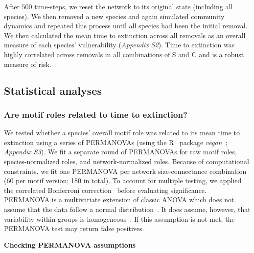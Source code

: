 \documentclass[12pt]{article}
\begin{document}
\begin{spacing}{2.0}
            After 500 time-steps, we reset the network to its original state (including all species). 
            We then removed a new species and again simulated community dynamics and repeated this process until all species had been the initial removal.
    		We then calculated the mean time to extinction across all removals as an overall measure of each species' vulnerability (\emph{Appendix S2}). 
    		Time to extinction was highly correlated across removals in all combinations of S and C and is a robust measure of risk.


	\subsection*{Statistical analyses}

		\subsubsection*{Are motif roles related to time to extinction?}

            We tested whether a species' overall motif role was related to its mean time to extinction using a series of PERMANOVAs (using the R~\citep{R} package \emph{vegan}~\citep{vegan}; \emph{Appendix S3}).
            We fit a separate round of PERMANOVAs for raw motif roles, species-normalized roles, and network-normalized roles.
            Because of computational constraints, we fit one PERMANOVA per network size-connectance combination (60 per motif version; 180 in total).
            To account for multiple testing,  we applied the correlated Bonferroni correction~\citep{Drezner2016} before evaluating significance.
            PERMANOVA is a multivariate extension of classic ANOVA which does not assume that the data follow a normal distribution~\citep{Anderson2001}.
            It does assume, however, that variability within groups is homogeneous~\citep{Anderson2001}.
            If this assumption is not met, the PERMANOVA test may return false positives.
            
            
            \textbf{Checking PERMANOVA assumptions}


\end{spacing}
\end{document}
